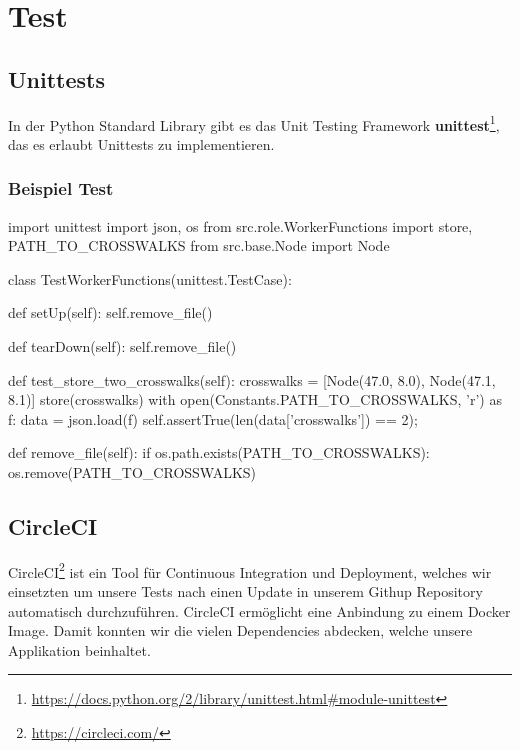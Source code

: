 \section{Test}
\subsection{Unittests}
In der Python Standard Library gibt es das Unit Testing Framework \textbf{unittest}\footnote{\url{https://docs.python.org/2/library/unittest.html\#module-unittest}}, das es erlaubt Unittests zu implementieren.

\subsubsection{Beispiel Test}
\begin{python}
import unittest
import json, os
from src.role.WorkerFunctions import store, PATH_TO_CROSSWALKS
from src.base.Node import Node

class TestWorkerFunctions(unittest.TestCase):

    def setUp(self):
        self.remove_file()

    def tearDown(self):
        self.remove_file()
        
    def test_store_two_crosswalks(self):
        crosswalks = [Node(47.0, 8.0), Node(47.1, 8.1)]
        store(crosswalks)
        with open(Constants.PATH_TO_CROSSWALKS, 'r') as f:
            data = json.load(f)
        self.assertTrue(len(data['crosswalks']) == 2);
        
    def remove_file(self):
        if os.path.exists(PATH_TO_CROSSWALKS):
            os.remove(PATH_TO_CROSSWALKS) 
\end{python}
\subsection{CircleCI}
CircleCI\footnote{\url{https://circleci.com/}} ist ein Tool für Continuous Integration und Deployment, welches wir einsetzten um unsere Tests nach einen Update in unserem Githup Repository automatisch durchzuführen. CircleCI ermöglicht eine Anbindung zu einem Docker Image. Damit konnten wir die vielen Dependencies abdecken, welche unsere Applikation beinhaltet.
